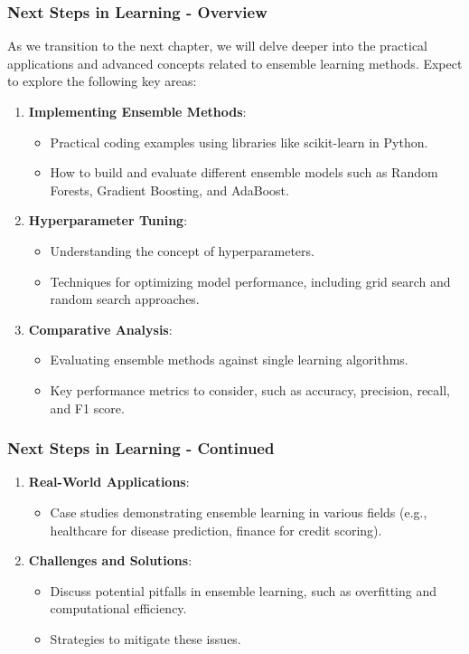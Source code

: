 \documentclass[aspectratio=169]{beamer}
\begin{document}
\begin{frame}[fragile]
  \frametitle{Next Steps in Learning - Overview}
  As we transition to the next chapter, we will delve deeper into the practical applications and advanced concepts related to ensemble learning methods. Expect to explore the following key areas:
  
  \begin{enumerate}
    \item \textbf{Implementing Ensemble Methods}:
      \begin{itemize}
        \item Practical coding examples using libraries like scikit-learn in Python.
        \item How to build and evaluate different ensemble models such as Random Forests, Gradient Boosting, and AdaBoost.
      \end{itemize}
      
    \item \textbf{Hyperparameter Tuning}:
      \begin{itemize}
        \item Understanding the concept of hyperparameters.
        \item Techniques for optimizing model performance, including grid search and random search approaches.
      \end{itemize}
      
    \item \textbf{Comparative Analysis}:
      \begin{itemize}
        \item Evaluating ensemble methods against single learning algorithms.
        \item Key performance metrics to consider, such as accuracy, precision, recall, and F1 score.
      \end{itemize}
  \end{enumerate}
\end{frame}

\begin{frame}[fragile]
  \frametitle{Next Steps in Learning - Continued}
  \begin{enumerate}[resume]
    \item \textbf{Real-World Applications}:
      \begin{itemize}
        \item Case studies demonstrating ensemble learning in various fields (e.g., healthcare for disease prediction, finance for credit scoring).
      \end{itemize}
      
    \item \textbf{Challenges and Solutions}:
      \begin{itemize}
        \item Discuss potential pitfalls in ensemble learning, such as overfitting and computational efficiency.
        \item Strategies to mitigate these issues.
      \end{itemize}
  \end{enumerate}
\end{frame}
\end{document}
